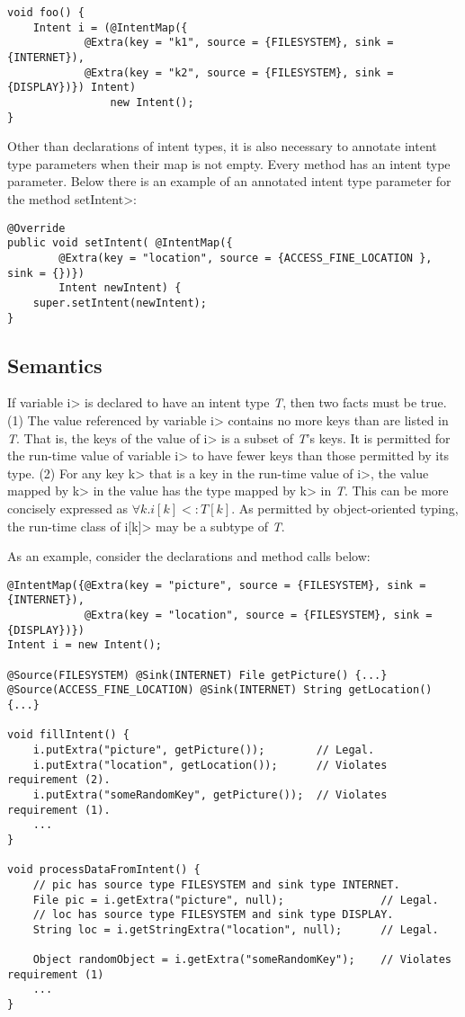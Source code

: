 \begin{Verbatim}
void foo() {
    Intent i = (@IntentMap({
            @Extra(key = "k1", source = {FILESYSTEM}, sink = {INTERNET}),
            @Extra(key = "k2", source = {FILESYSTEM}, sink = {DISPLAY})}) Intent)
                new Intent();
}
\end{Verbatim}

Other than declarations of intent types, it is also necessary to annotate intent
type parameters when their map is not empty. Every \onReceive{} method has an
intent type parameter. Below there is an example of an annotated intent type
parameter for the \onReceive{} method \<setIntent>:

\begin{Verbatim}
@Override
public void setIntent( @IntentMap({
        @Extra(key = "location", source = {ACCESS_FINE_LOCATION }, sink = {})})
        Intent newIntent) {
    super.setIntent(newIntent);
}
\end{Verbatim}

\subsection{Semantics}
If variable \<i> is declared to have an intent type \textit{T}, then two facts must be
true. (1) The value referenced by variable \<i> contains no more keys than are
listed in \textit{T}. That is, the keys of the value of \<i> is a subset of
\textit{T}'s keys. It is
permitted for the run-time value of variable \<i> to have fewer keys than those
permitted by its type. (2) For any key \<k> that is a key in the run-time value
of \<i>, the value mapped by \<k> in the value has the type mapped by \<k> in
\textit{T}. This can be more concisely expressed as $\forall k.i[k] <: T[k]$.
As permitted by
object-oriented typing, the run-time class of \<i[k]> may be a subtype of
\textit{T}.

As an example, consider the declarations and method calls below:

\begin{Verbatim}
@IntentMap({@Extra(key = "picture", source = {FILESYSTEM}, sink = {INTERNET}),
            @Extra(key = "location", source = {FILESYSTEM}, sink = {DISPLAY})}) 
Intent i = new Intent();

@Source(FILESYSTEM) @Sink(INTERNET) File getPicture() {...}
@Source(ACCESS_FINE_LOCATION) @Sink(INTERNET) String getLocation() {...}

void fillIntent() {
    i.putExtra("picture", getPicture());        // Legal.
    i.putExtra("location", getLocation());      // Violates requirement (2).
    i.putExtra("someRandomKey", getPicture());  // Violates requirement (1).
    ...
}

void processDataFromIntent() {
    // pic has source type FILESYSTEM and sink type INTERNET.
    File pic = i.getExtra("picture", null);               // Legal.
    // loc has source type FILESYSTEM and sink type DISPLAY.
    String loc = i.getStringExtra("location", null);      // Legal.
    
    Object randomObject = i.getExtra("someRandomKey");    // Violates requirement (1)
    ...
}
\end{Verbatim}


